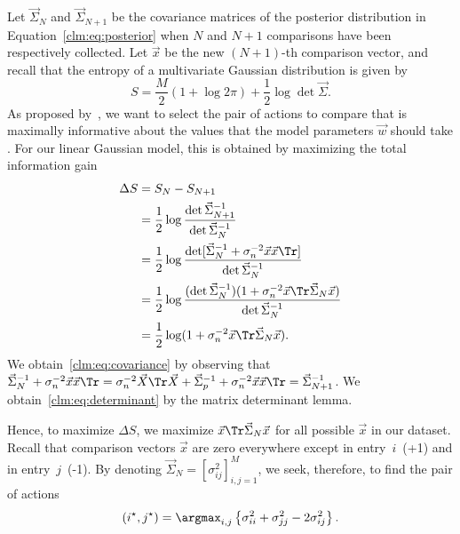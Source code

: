 Let $\vec{\Sigma}_N$ and  $\vec{\Sigma}_{N+1}$ be the covariance matrices of the posterior distribution in Equation~\eqref{clm:eq:posterior} when $N$ and $N+1$ comparisons have been respectively collected.
Let $\vec{x}$ be the new $(N+1)$-th comparison vector, and recall that the entropy of a multivariate Gaussian distribution is given by
\begin{equation}
	S = \frac{M}{2}(1 + \log 2 \pi) + \frac{1}{2} \log \det \vec{\Sigma}.
\end{equation}
As proposed by~\citet{mackay1992information}, we want to select the pair of actions to compare that is maximally informative about the values that the model parameters $\vec{w}$ should take \citep{chu2005extensions, houlsby2012collaborative}.
For our linear Gaussian model, this is obtained by maximizing the total information gain
\begin{align}
	\Delta S & = S_N - S_{N+1}  \nonumber                                                                                                                                         \\
	         & = \frac{1}{2} \log \frac{\det \vec{\Sigma}_{N+1}^{-1}}{\det \vec{\Sigma}_N^{-1}} \nonumber                                                                         \\
	         & = \frac{1}{2} \log \frac{\det [\vec{\Sigma}_N^{-1} + \sigma_n^{-2}\vec{x}\vec{x}\Tr] }{\det \vec{\Sigma}_N^{-1}} \label{clm:eq:covariance}                         \\
	         & = \frac{1}{2} \log \frac{(\det \vec{\Sigma}_N^{-1})(1 + \sigma_n^{-2} \vec{x}\Tr \vec{\Sigma}_N \vec{x} ) }{ \det \vec{\Sigma}_N^{-1} } \label{clm:eq:determinant} \\
	         & = \frac{1}{2} \log (1 + \sigma_n^{-2} \vec{x}\Tr \vec{\Sigma}_N \vec{x}). \nonumber
\end{align}
We obtain~\eqref{clm:eq:covariance} by observing that $ \vec{\Sigma}_N^{-1} + \sigma_n^{-2} \vec{x} \vec{x}\Tr = \sigma_n^{-2} \vec{X}\Tr \vec{X} + \vec{\Sigma}_p^{-1} + \sigma_n^{-2} \vec{x} \vec{x}\Tr = \vec{\Sigma}_{N+1}^{-1}$.
We obtain~\eqref{clm:eq:determinant} by the matrix determinant lemma.

Hence, to maximize $\Delta S$, we maximize $ \vec{x}\Tr \vec{\Sigma}_N \vec{x} $ for all possible $ \vec{x} $ in our dataset.
Recall that comparison vectors $ \vec{x} $ are zero everywhere except in entry~$i$~(+1) and in entry~$j$~(-1).
By denoting $\vec{\Sigma}_N = [\sigma_{ij}^2]_{i, j = 1}^M$, we seek, therefore, to find the pair of actions
\begin{equation*}
	(i^\star, j^\star) = \argmax_{i, j} \left\{ \sigma_{ii}^2 + \sigma_{jj}^2 - 2 \sigma_{ij}^2 \right\}.
\end{equation*}

